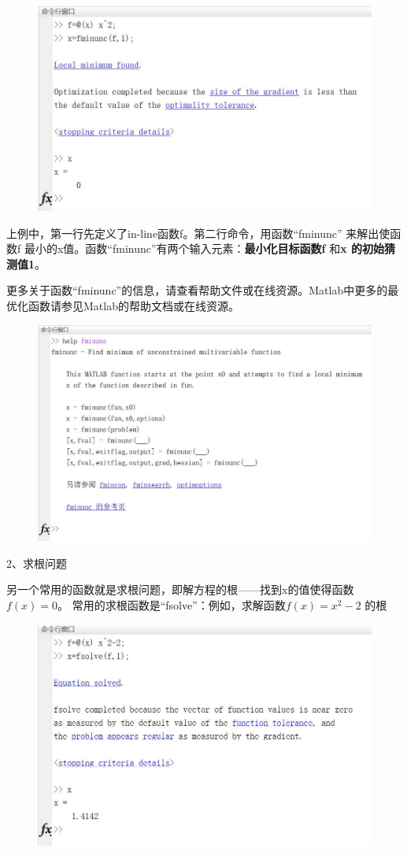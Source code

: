 \documentclass[cn,10pt,math=newtx,citestyle=gb7714-2015,bibstyle=gb7714-2015]{elegantbook}
\begin{document}
{{	\begin{figure}[htbp!]
		\centering
		\includegraphics[width=0.8\linewidth]{FIG/fminunc}
		\centering
	\end{figure}
	
	上例中，第一行先定义了in-line函数f。第二行命令，用函数“fminunc” 来解出使函数f 最小的x值。函数“fminunc”有两个输入元素：\textbf{最小化目标函数f} 和\textbf{x 的初始猜测值1}。
	
	更多关于函数“fminunc”的信息，请查看帮助文件或在线资源。Matlab中更多的最优化函数请参见Matlab的帮助文档或在线资源。
	
	\begin{figure}[htbp!]
		\centering
		\includegraphics[width=0.8\linewidth]{FIG/helpfminunc}
		\centering
	\end{figure}
	
	2、求根问题
	
	另一个常用的函数就是求根问题，即解方程的根——找到x的值使得函数$f(x)=0$。 常用的求根函数是“fsolve”：例如，求解函数$f(x)=x^2-2$ 的根
	
	\begin{figure}[htbp!]
		\centering
		\includegraphics[width=0.8\linewidth]{FIG/fsolve}
		\centering
	\end{figure}
	
}}
\end{document}
